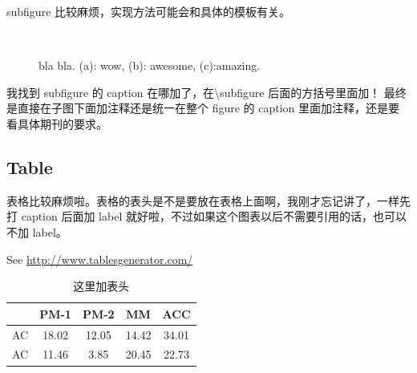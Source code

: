subfigure 比较麻烦，实现方法可能会和具体的模板有关。
\begin{figure}[h]
    \centering
    ~
    ~
    \caption{bla bla. (a): wow, (b): awesome, (c):amazing.}
    \label{fig:bla bla}
\end{figure}

我找到 subfigure 的 caption 在哪加了，在\textbackslash subfigure 后面的方括号里面加！
最终是直接在子图下面加注释还是统一在整个 figure 的 caption 里面加注释，还是要看具体期刊的要求。

\subsection{Table}
表格比较麻烦啦。表格的表头是不是要放在表格上面啊，我刚才忘记讲了，一样先打 caption
后面加 label 就好啦，不过如果这个图表以后不需要引用的话，也可以不加 label。

See \url{http://www.tablesgenerator.com/}

\begin{table}[h]
    \centering
    \begin{tabular}{|lcccc|}    %
    \hline      %
       & \textbf{PM-1}  & \textbf{PM-2}  & \textbf{MM}    & \textbf{ACC}   \\
    \hline
    AC & 18.02 & 12.05 & 14.42 & 34.01 \\
    AC & 11.46 & 3.85  & 20.45 & 22.73 \\   %
    \hline  
    \end{tabular}
    \caption{这里加表头} %
\end{table}

